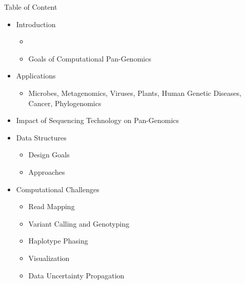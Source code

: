 \documentclass[notes=hide]{beamer}
\newcommand{\0}{\ensuremath{\mathtt{0}}}
\newcommand{\1}{\ensuremath{\mathtt{1}}}
\begin{document}
\begin{frame}{Table of Content}
\begin{itemize}
 \item Introduction
 \begin{itemize}
    \item {}
    \item Goals of Computational Pan-Genomics
 \end{itemize}
\item Applications
 \begin{itemize}
    \item Microbes, Metagenomics, Viruses, Plants, Human Genetic Diseases, Cancer, Phylogenomics
 \end{itemize}
\item Impact of Sequencing Technology on Pan-Genomics
\item Data Structures
 \begin{itemize}
    \item Design Goals
    \item Approaches
 \end{itemize}
\item Computational Challenges
 \begin{itemize}
    \item Read Mapping
    \item Variant Calling and Genotyping
    \item Haplotype Phasing
    \item Visualization
    \item Data Uncertainty Propagation
 \end{itemize}
\end{itemize}
\end{frame}
\end{document}
